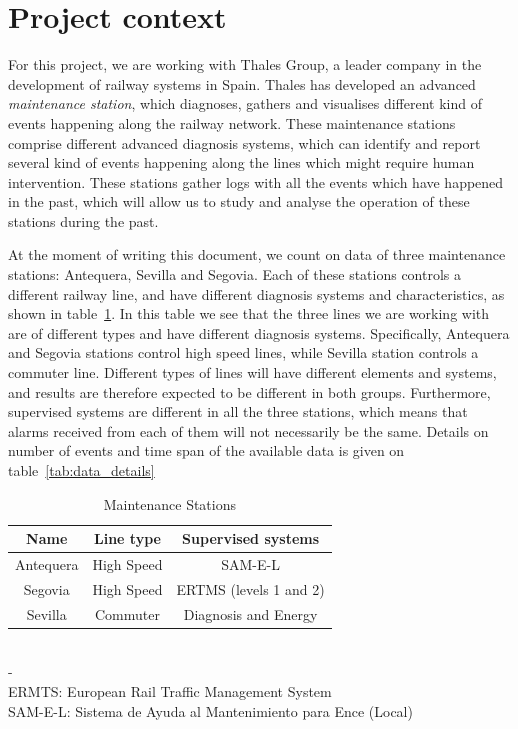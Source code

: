 \documentclass[a4paper,10pt]{report}
\begin{document}
\section{Project context}
For this project, we are working with Thales Group, a leader company in the development of railway systems in Spain. Thales has developed an advanced \emph{maintenance station}, which diagnoses, gathers and visualises different kind of events happening along the railway network. These maintenance stations comprise different advanced diagnosis systems, which can identify and report several kind of events happening along the lines which might require human intervention. These stations gather logs with all the events which have happened in the past, which will allow us to study and analyse the operation of these stations during the past.

At the moment of writing this document, we count on data of three maintenance stations: Antequera, Sevilla and Segovia. Each of these stations controls a different railway line, and have different diagnosis systems and characteristics, as shown in table~\ref{tab:stations}. In this table we see that the three lines we are working with are of different types and have different diagnosis systems. Specifically, Antequera and Segovia stations control high speed lines, while Sevilla station controls a commuter line. Different types of lines will have different elements and systems, and results are therefore expected to be different in both groups. Furthermore, supervised systems are different in all the three stations, which means that alarms received from each of them will not necessarily be the same. Details on number of events and time span of the available data is given on table~\ref{tab:data_details}

\begin{table}
\begin{center}
\begin{tabular}{|c|c|c|}
\hline Name & Line type & Supervised systems \\ 
\hline Antequera & High Speed & SAM-E-L \\ 
\hline Segovia & High Speed & ERTMS (levels 1 and 2) \\ 
\hline Sevilla & Commuter & Diagnosis and Energy \\ 
\hline 
\end{tabular}
\\
-\\
ERMTS: European Rail Traffic Management System\\
SAM-E-L: Sistema de Ayuda al Mantenimiento para Ence (Local)\\

\end{center} 
\caption {Maintenance Stations} \label{tab:stations} 
\end{table}
\end{document}
